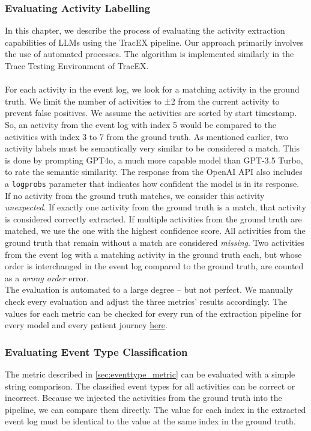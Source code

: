 \subsubsection{Evaluating Activity Labelling}\label{sec:eval_activity}
In this chapter, we describe the process of evaluating the activity extraction capabilities of LLMs using the TracEX pipeline. Our approach primarily involves the use of automated processes. The algorithm is implemented similarly in the Trace Testing Environment of TracEX.\\\\
For each activity in the event log, we look for a matching activity in the ground truth. We limit the number of activities to ±2 from the current activity to prevent false positives. We assume the activities are sorted by start timestamp. So, an activity from the event log with index 5 would be compared to the activities with index 3 to 7 from the ground truth. As mentioned earlier, two activity labels must be semantically very similar to be considered a match. This is done by prompting GPT4o, a much more capable model than GPT-3.5 Turbo, to rate the semantic similarity. The response from the OpenAI API also includes a \verb|logprobs| parameter that indicates how confident the model is in its response. If no activity from the ground truth matches, we consider this activity \emph{unexpected}. If exactly one activity from the ground truth is a match, that activity is considered correctly extracted. If multiple activities from the ground truth are matched, we use the one with the highest confidence score. All activities from the ground truth that remain without a match are considered \emph{missing}. Two activities from the event log with a matching activity in the ground truth each, but whose order is interchanged in the event log compared to the ground truth, are counted as a \emph{wrong order} error.\\
The evaluation is automated to a large degree – but not perfect. We manually check every evaluation and adjust the three metrics' results accordingly. The values for each metric can be checked for every run of the extraction pipeline for every model and every patient journey \href{https://github.com/FR-SON/Bachelor-Thesis/tree/main/bachelor_thesis/data/evaluation_data}{here}.

\subsubsection{Evaluating Event Type Classification}\label{sec:eval_event_type}
The metric described in \autoref{sec:eventtype_metric} can be evaluated with a simple string comparison. The classified event types for all activities can be correct or incorrect. Because we injected the activities from the ground truth into the pipeline, we can compare them directly. The value for each index in the extracted event log must be identical to the value at the same index in the ground truth.

